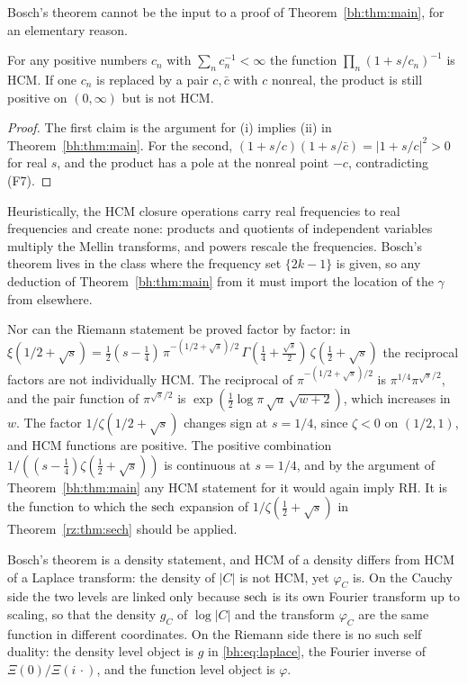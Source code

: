 Bosch's theorem cannot be the input to a proof of Theorem~\ref{bh:thm:main}, for an elementary reason.

\begin{proposition}\label{bh:prop:closure}
For any positive numbers $c_n$ with $\sum_n c_n^{-1}<\infty$ the function $\prod_n(1+s/c_n)^{-1}$ is HCM. If one $c_n$ is replaced by a pair $c,\bar c$ with $c$ nonreal, the product is still positive on $(0,\infty)$ but is not HCM.
\end{proposition}

\begin{proof}
The first claim is the argument for (i) implies (ii) in Theorem~\ref{bh:thm:main}. For the second, $(1+s/c)(1+s/\bar c)=|1+s/c|^2>0$ for real $s$, and the product has a pole at the nonreal point $-c$, contradicting (F7).
\end{proof}

Heuristically, the HCM closure operations carry real frequencies to real frequencies and create none: products and quotients of independent variables multiply the Mellin transforms, and powers rescale the frequencies. Bosch's theorem lives in the class where the frequency set $\{2k-1\}$ is given, so any deduction of Theorem~\ref{bh:thm:main} from it must import the location of the $\gamma$ from elsewhere.

Nor can the Riemann statement be proved factor by factor: in $\xi(1/2+\sqrt{s})=\tfrac12(s-\tfrac14)\,\pi^{-(1/2+\sqrt s)/2}\,\Gamma(\tfrac14+\tfrac{\sqrt s}{2})\,\zeta(\tfrac12+\sqrt s)$ the reciprocal factors are not individually HCM. The reciprocal of $\pi^{-(1/2+\sqrt s)/2}$ is $\pi^{1/4}\pi^{\sqrt s/2}$, and the pair function of $\pi^{\sqrt s/2}$ is $\exp(\tfrac12\log\pi\,\sqrt u\,\sqrt{w+2})$, which increases in $w$. The factor $1/\zeta(1/2+\sqrt s)$ changes sign at $s=1/4$, since $\zeta<0$ on $(1/2,1)$, and HCM functions are positive. The positive combination $1/((s-\tfrac14)\zeta(\tfrac12+\sqrt s))$ is continuous at $s=1/4$, and by the argument of Theorem~\ref{bh:thm:main} any HCM statement for it would again imply RH. It is the function to which the $\operatorname{sech}$ expansion of $1/\zeta(\tfrac12+\sqrt s)$ in Theorem~\ref{rz:thm:sech} should be applied.

Bosch's theorem is a density statement, and HCM of a density differs from HCM of a Laplace transform: the density of $|C|$ is not HCM, yet $\varphi_C$ is. On the Cauchy side the two levels are linked only because $\operatorname{sech}$ is its own Fourier transform up to scaling, so that the density $g_C$ of $\log|C|$ and the transform $\varphi_C$ are the same function in different coordinates. On the Riemann side there is no such self duality: the density level object is $g$ in \eqref{bh:eq:laplace}, the Fourier inverse of $\Xi(0)/\Xi(i\,\cdot)$, and the function level object is $\varphi$.

